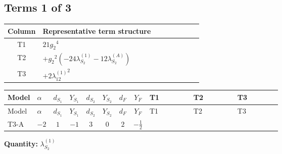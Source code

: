 \documentclass[8pt]{article}
\begin{document}
\begin{landscape}
\subsection*{Terms 1 of 3}
\begin{center}
\begin{tabular}{@{}c >{\raggedright\arraybackslash}p{0.82\linewidth}@{}}
\toprule
Column & Representative term structure \\
\midrule
T1 & \(\displaystyle 21 {g_2}^4\) \\
\midrule
T2 & \(\displaystyle +{g_2}^2 (-24 {\lambda_{S_2}^{(1)}}-12 {\lambda_{S_2}^{(A)}})\) \\
\midrule
T3 & \(\displaystyle +2 {\lambda_{12}^{(1)}}^2\) \\
\midrule
\bottomrule
\end{tabular}
\end{center}
\smallskip
\tiny
\begin{longtable}{@{}llcccccc >{\raggedright\arraybackslash}p{0.21\linewidth} >{\raggedright\arraybackslash}p{0.21\linewidth} >{\raggedright\arraybackslash}p{0.21\linewidth}@{}}
\toprule
Model & $\alpha$ & $d_{S_1}$ & $Y_{S_1}$ & $d_{S_2}$ & $Y_{S_2}$ & $d_F$ & $Y_F$ & T1 & T2 & T3 \\
\midrule
\endfirsthead
\toprule
Model & $\alpha$ & $d_{S_1}$ & $Y_{S_1}$ & $d_{S_2}$ & $Y_{S_2}$ & $d_F$ & $Y_F$ & T1 & T2 & T3 \\
\midrule
\endhead
T3-A & $-2$ & $1$ & $-1$ & $3$ & $0$ & $2$ & $-\frac{1}{2}$ & \scriptsize\adjustbox{max width=\linewidth}{$\begin{gathered} 21 {g_2}^4\end{gathered}$} & \scriptsize\adjustbox{max width=\linewidth}{$\begin{gathered} +{g_2}^2 (-24 {\lambda_{S_2}^{(1)}}-12 {\lambda_{S_2}^{(A)}})\end{gathered}$} & \scriptsize\adjustbox{max width=\linewidth}{$\begin{gathered} +2 {\lambda_{12}^{(1)}}^2\end{gathered}$} \\
\midrule
\bottomrule
\end{longtable}
\clearpage
\noindent\textbf{Quantity: }$\lambda_{S_2}^{(1)}$\par\smallskip

\end{landscape}
\end{document}
